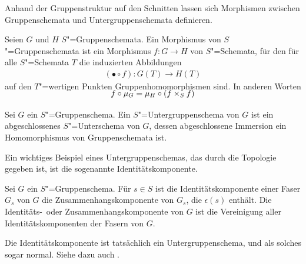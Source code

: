 Anhand der Gruppenstruktur auf den Schnitten lassen sich
Morphismen zwischen Gruppenschemata und Untergruppenschemata
definieren.
\begin{Definition}
  Seien $G$ und $H$ $S$"=Gruppenschemata.
  Ein Morphismus von $S$"=Gruppenschemata ist ein Morphismus $f\colon
  G\to H$ von $S$"=Schemata, für den für alle $S$"=Schemata $T$ die
  induzierten Abbildungen
  \begin{gather*}
    (\bullet\circ f)\colon G(T)\to H(T)
  \end{gather*}
  auf den $T$"=wertigen Punkten Gruppenhomomorphismen sind.
  In anderen Worten
  \begin{gather*}
    \SwapAboveDisplaySkip
    f\circ\mu_G = \mu_H\circ(f\times_S f)
  \end{gather*}
\end{Definition}

\begin{Definition}[Untergruppenschema]
  Sei $G$ ein $S$"=Gruppenschema.
  Ein $S$"=Untergruppenschema von $G$ ist ein abgeschlossenes
  $S$"=Unterschema von $G$, dessen abgeschlossene Immersion ein
  Homomorphismus von Gruppenschemata ist.
\end{Definition}

Ein wichtiges Beispiel eines Untergruppenschemas, das durch die
Topologie gegeben ist, ist die sogenannte Identitätskomponente.
\begin{Definition}[Identitätskomponente]
  Sei $G$ ein $S$"=Gruppenschema.
  Für $s\in S$ ist die Identitätskomponente einer Faser $G_s$ von $G$
  die Zusammenhangskomponente von $G_s$, die $\epsilon(s)$ enthält.
  Die Identitäts-~oder Zusammenhangskomponente von $G$ ist
  die Vereinigung aller Identitätskomponenten der Fasern von $G$.
\end{Definition}
Die Identitätskomponente ist tatsächlich ein Untergruppenschema, und
als solches sogar normal. Siehe dazu auch
\cite[Proposition~IV.1.5]{silverman2}.

